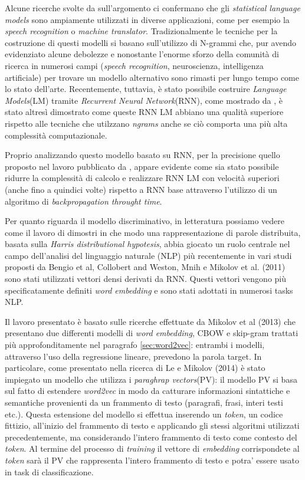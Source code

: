 \documentclass[a4paper,12pt,openright,twoside]{report}
\theoremstyle{definition}
\begin{document}
Alcune ricerche svolte da \cite{Miktesi} sull'argomento ci confermano che 
gli \emph{statistical language models} sono ampiamente utilizzati
in diverse applicazioni, come per esempio la \emph{speech recognition} o \emph{machine translator}.
Tradizionalmente le tecniche per la costruzione di questi modelli si basano sull'utilizzo di 
N-grammi che,
pur avendo evidenziato alcune debolezze e nonostante l'enorme sforzo della
comunità di ricerca in numerosi campi (\emph{speech recognition}, neuroscienza, intelligenza
artificiale) per trovare un modello alternativo sono rimasti per lungo tempo come lo stato dell'arte.
Recentemente, tuttavia, è stato possibile costruire \emph{Language Models}(LM) 
tramite \emph{Recurrent Neural Network}(RNN), come mostrado da \cite{Mik2010,MikEmp},
è stato altresì dimostrato come queste RNN LM abbiano una qualità superiore rispetto alle tecniche
che utilzzano \emph{n\-grams} anche se ciò comporta una più alta complessità computazionale.

Proprio analizzando questo modello basato su RNN, per la precisione quello
proposto nel lavoro pubblicato da \cite{MikRNN}, appare evidente come sia
stato possibile ridurre la complessità  di calcolo e realizzare RNN LM con
velocità superiori (anche fino a quindici volte) rispetto a RNN base attraverso l'utilizzo
di un algoritmo di \emph{backpropagation throught time}.

Per quanto riguarda il modello discriminativo, in letteratura possiamo vedere come il lavoro di \cite{Baroni2010}
dimostri in che modo una rappresentazione di parole distribuita, 
basata sulla \emph{Harris distributional hypotesis},
abbia giocato un ruolo centrale nel campo dell'analisi del linguaggio naturale (NLP)
più recentemente in vari studi proposti da 
Bengio et al, Collobert and Weston, Mnih e Mikolov et al. (2011) %
sono stati utilizzati vettori densi derivati da RNN. Questi vettori vengono più specificatamente
definiti \emph{word embedding} e sono stati adottati in numerosi tasks NLP.

Il lavoro presentato è basato sulle ricerche effettuate da Mikolov et al (2013) %
che presentano due differenti modelli di \emph{word embedding}, CBOW e 
skip-gram trattati più approfonditamente nel paragrafo \ref{sec:word2vec}:
entrambi i modelli,
attraverso l'uso della regressione lineare, prevedono la parola target.
In particolare, come presentato nella ricerca di Le e Mikolov (2014)%
è stato impiegato
un modello che utilizza i \emph{paraghrap vectors}(PV): il modello PV si basa sul fatto
di estendere \emph{word2vec} in modo da catturare informazioni sintattiche e semantiche 
provenienti da un frammento di testo (paragrafi, frasi, interi testi etc.).
Questa estensione del modello si effettua inserendo un \emph{token}, un codice fittizio,
all'inizio del frammento di testo e applicando gli stessi algoritmi utilizzati 
precedentemente, ma considerando l'intero frammento di testo come contesto del \emph{token}.
Al termine del processo di \emph{training} il vettore di \emph{embedding} corrispondete
al \emph{token} sarà il PV che rappresenta l'intero frammento di testo e potra'
essere usato in task di classificazione.
\end{document}
